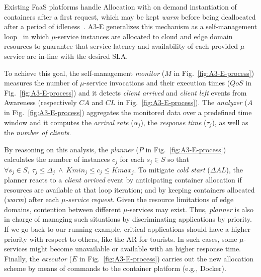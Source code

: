 

Existing FaaS platforms handle Allocation with on demand instantiation of containers after a first request, which may be kept \textit{warm} before being deallocated after a period of idleness~\cite{AWSLambda, OpenWhisk}. A3-E generalizes this mechanism as a self-management loop~\cite{kephart2003vision}
in which $\mu$-service instances are allocated to cloud and edge domain resources to guarantee that service latency and availability of each provided $\mu$-service are in-line with the desired SLA. 

To achieve this goal, the self-management \textit{monitor} ($M$ in Fig.~\ref{fig:A3-E-process}) measures the number of $\mu$-service invocations  and their execution times ($QoS$ in Fig.~\ref{fig:A3-E-process}) and it detects \textit{client arrived} and \textit{client left} events from Awareness (respectively $CA$ and $CL$ in Fig.~\ref{fig:A3-E-process}). %
The \textit{analyzer} ($A$ in Fig.~\ref{fig:A3-E-process}) aggregates the monitored data over a predefined time window and it computes the \textit{arrival rate} ($\alpha_j$), the \textit{response time} ($\tau_j$), as well as the \textit{number of clients}. 

By reasoning on this analysis, the \textit{planner} ($P$ in Fig.~\ref{fig:A3-E-process}) calculates the number of instances $c_j$ for each $s_j \in S$ so that $\forall s_j \in S,\ \tau_j \le \Delta_j\ \wedge\ Kmin_j \le c_j \le Kmax_j$. To mitigate \textit{cold start} ($\Delta AL$), the planner reacts to a \textit{client arrived} event by anticipating container allocation if resources are available at that loop iteration; and by keeping containers allocated (\textit{warm}) after each \textit{$\mu$-service request}. Given the resource limitations of edge domains, contention between different $\mu$-services may exist. Thus, \textit{planner} is also in charge of managing such situations by discriminating applications by priority. If we go back to our running example, critical applications should have a higher priority with respect to others, like the AR for tourists. In such cases, some $\mu$-services might become unavailable or available with an higher response time. Finally, the \textit{executor} ($E$ in Fig.~\ref{fig:A3-E-process}) carries out the new allocation scheme by means of commands to the container platform (e.g., Docker).


